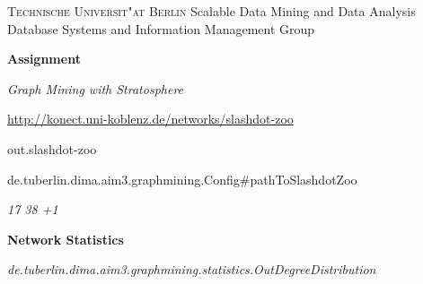 \documentclass[11pt,a4paper]{article}
\begin{document}
\textsc{Technische Universit"at Berlin}{\small\hfill 
Scalable Data Mining and Data Analysis}\\
{\small Database Systems and Information Management Group}

\bigskip
\centerline{\Large\textbf{Assignment}}
\centerline{\emph{Graph Mining with Stratosphere}}
\bigskip

\url{http://konect.uni-koblenz.de/networks/slashdot-zoo}

out.slashdot-zoo

de.tuberlin.dima.aim3.graphmining.Config#pathToSlashdotZoo

\textit{17 38 +1}


\centerline{\textbf{Network Statistics}}
\bigskip

\textit{de.tuberlin.dima.aim3.graphmining.statistics.OutDegreeDistribution}
\end{document}
